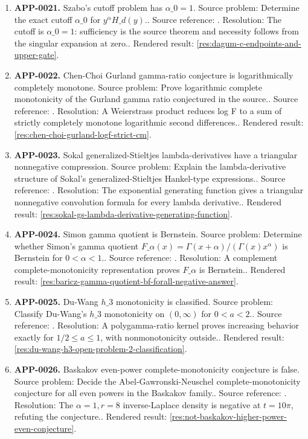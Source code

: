 \begin{enumerate}[leftmargin=*]
\item \textbf{APP-0021.} Szabo's cutoff problem has \(\alpha\_0=1\).  Source problem: Determine the exact cutoff \(\alpha\_0\) for \(y^\alpha H\_d(y)\).. Source reference: \cite{szabo-cm}. Resolution: The cutoff is \(\alpha\_0=1\): sufficiency is the source theorem and necessity follows from the singular expansion at zero.. Rendered result: \ref{res:dagum-c-endpoints-and-upper-gate}.
\item \textbf{APP-0022.} Chen-Choi Gurland gamma-ratio conjecture is logarithmically completely monotone.  Source problem: Prove logarithmic complete monotonicity of the Gurland gamma ratio conjectured in the source.. Source reference: \cite{chen-choi-gurland}. Resolution: A Weierstrass product reduces log F to a sum of strictly completely monotone logarithmic second differences.. Rendered result: \ref{res:chen-choi-gurland-logf-strict-cm}.
\item \textbf{APP-0023.} Sokal generalized-Stieltjes lambda-derivatives have a triangular nonnegative compression.  Source problem: Explain the lambda-derivative structure of Sokal's generalized-Stieltjes Hankel-type expressions.. Source reference: \cite{sokal-gs}. Resolution: The exponential generating function gives a triangular nonnegative convolution formula for every lambda derivative.. Rendered result: \ref{res:sokal-gs-lambda-derivative-generating-function}.
\item \textbf{APP-0024.} Simon gamma quotient is Bernstein.  Source problem: Determine whether Simon's gamma quotient \(F\_\alpha(x)=\Gamma(x+\alpha)/(\Gamma(x)x^\alpha)\) is Bernstein for \(0<\alpha<1\).. Source reference: \cite{app-app-0024-source}. Resolution: A complement complete-monotonicity representation proves \(F\_\alpha\) is Bernstein.. Rendered result: \ref{res:baricz-gamma-quotient-bf-forall-negative-answer}.
\item \textbf{APP-0025.} Du-Wang \(h\_3\) monotonicity is classified.  Source problem: Classify Du-Wang's \(h\_3\) monotonicity on \((0,\infty)\) for \(0<a<2\).. Source reference: \cite{du-wang-h3}. Resolution: A polygamma-ratio kernel proves increasing behavior exactly for \(1/2\le a\le1\), with nonmonotonicity outside.. Rendered result: \ref{res:du-wang-h3-open-problem-2-classification}.
\item \textbf{APP-0026.} Baskakov even-power complete-monotonicity conjecture is false.  Source problem: Decide the Abel-Gawronski-Neuschel complete-monotonicity conjecture for all even powers in the Baskakov family.. Source reference: \cite{abel-gawronski-neuschel}. Resolution: The \(\alpha=1,r=8\) inverse-Laplace density is negative at \(t=10\pi\), refuting the conjecture.. Rendered result: \ref{res:not-baskakov-higher-power-even-conjecture}.

\end{enumerate}
